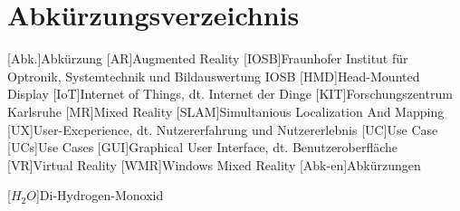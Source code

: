 
\chapter*{Abkürzungsverzeichnis}                   %

\begin{acronym}[DHBW]
 [Abk.]{Abkürzung}
 [AR]{Augmented Reality}
 [IOSB]{Fraunhofer Institut für Optronik, Systemtechnik und Bildauswertung IOSB}
 [HMD]{Head-Mounted Display}
 [IoT]{Internet of Things, dt. Internet der Dinge}
 [KIT]{Forschungszentrum Karlsruhe}
 [MR]{Mixed Reality}
 [SLAM]{Simultanious Localization And Mapping}
 [UX]{User-Excperience, dt. Nutzererfahrung und Nutzererlebnis}
 [UC]{Use Case}
 [UCs]{Use Cases}
 [GUI]{Graphical User Interface, dt. Benutzeroberfläche}
 [VR]{Virtual Reality}
 [WMR]{Windows Mixed Reality}
 [Abk-en]{Abkürzungen}


 [\ensuremath{H_2O}]{Di-Hydrogen-Monoxid}

\end{acronym}
